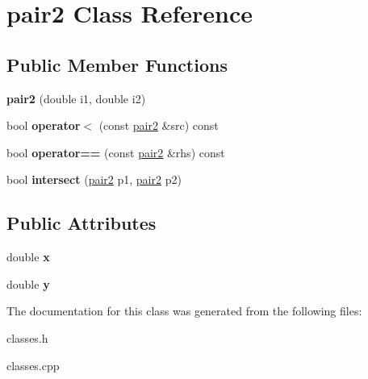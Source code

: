 \hypertarget{classpair2}{}\section{pair2 Class Reference}
\label{classpair2}
\subsection*{Public Member Functions}
\begin{DoxyCompactItemize}
\item 
\mbox{\label{classpair2_adb1a9362760bb925295f3422f1df424b}} 
{\bfseries pair2} (double i1, double i2)
\item 
\mbox{\label{classpair2_ad28c08f071dfb7ddae18e4d5ea9ea9c1}} 
bool {\bfseries operator$<$} (const \mbox{\hyperlink{classpair2}{pair2}} \&src) const
\item 
\mbox{\label{classpair2_abf5a0ceb5035f744f6dabdf6a97902bf}} 
bool {\bfseries operator==} (const \mbox{\hyperlink{classpair2}{pair2}} \&rhs) const
\item 
\mbox{\label{classpair2_a7c6b5eaef6f52bc68ea3ed3437752769}} 
bool {\bfseries intersect} (\mbox{\hyperlink{classpair2}{pair2}} p1, \mbox{\hyperlink{classpair2}{pair2}} p2)
\end{DoxyCompactItemize}
\subsection*{Public Attributes}
\begin{DoxyCompactItemize}
\item 
\mbox{\label{classpair2_a3642c27aff74f421549132c0f8b806da}} 
double {\bfseries x}
\item 
\mbox{\label{classpair2_a97b0eb83e4dcb38ad24f3c26e0c2fed7}} 
double {\bfseries y}
\end{DoxyCompactItemize}


The documentation for this class was generated from the following files\+:\begin{DoxyCompactItemize}
\item 
classes.\+h\item 
classes.\+cpp\end{DoxyCompactItemize}
